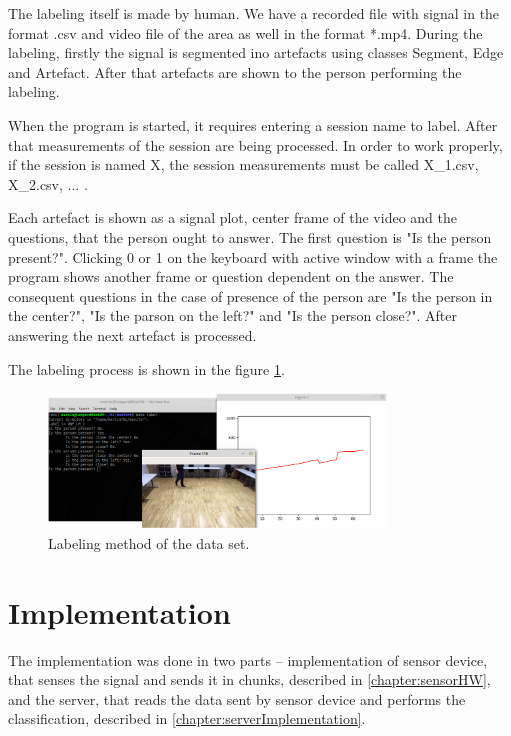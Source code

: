 The labeling itself is made by human. We have a recorded file with signal in the format .csv
and video file of the area as well in the format *.mp4. During the labeling, firstly the 
signal is segmented ino artefacts using classes Segment, Edge and Artefact. After that
artefacts are shown to the person performing the labeling.

When the program is started, it requires entering a session name to label. After that
measurements of the session are being processed. In order to work properly, if the
session is named X, the session measurements must be called X\_1.csv, X\_2.csv, ... .

Each artefact is shown as a signal plot, center frame of the video and the questions,
that the person ought to answer. The first question is "Is the person present?".
Clicking 0 or 1 on the keyboard with active window with a frame the program shows
another frame or question dependent on the answer. The consequent questions 
in the case of presence of the person are "Is the person in the center?", "Is the
parson on the left?" and "Is the person close?". After answering the next artefact
is processed.

The labeling process is shown in the figure \ref{fig:labeling}.

\begin{figure}[h!]
\begin{center}
\includegraphics[width=0.8\textwidth]{img/labeling2.png}
\caption{Labeling method of the data set.\label{fig:labeling}}
\end{center}
\end{figure}




\chapter{Implementation}

The implementation was done in two parts -- implementation of sensor device, that senses
the signal and sends it in chunks, described in \ref{chapter:sensorHW}, and the server,
that reads the data sent by sensor device and performs the classification, described in
\ref{chapter:serverImplementation}.

